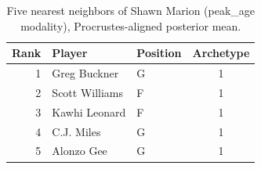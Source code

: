 \begin{table}[htbp]
  \centering\small
  \begin{tabular}{rllc}
    \toprule
    Rank & Player & Position & Archetype \\
    \midrule
    1 & Greg Buckner & G & 1 \\
    2 & Scott Williams & F & 1 \\
    3 & Kawhi Leonard & F & 1 \\
    4 & C.J. Miles & G & 1 \\
    5 & Alonzo Gee & G & 1 \\
    \bottomrule
  \end{tabular}
  \caption{Five nearest neighbors of Shawn Marion (peak_age modality), Procrustes-aligned posterior mean.}
  \label{tab:Shawn_Marion_neighbors_peak_age}
\end{table}

